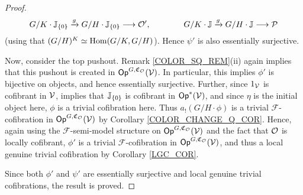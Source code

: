 \documentclass[a4paper,10pt
,draft
]{article}%
\renewcommand{\F}{\mathcal F}
\newcommand{\J}{\mathbb J}
\renewcommand{\1}{\eta}%
\begin{document}
\begin{proof}
      \begin{equation}
            G/K \cdot \J_{\set{0}} \xrightarrow{g} G/H \cdot \J_{\set{0}} \longto \O',
            \qquad \qquad
            G/K \cdot \J \xrightarrow{g} G/H \cdot \J \longto \P
      \end{equation}
      (using that $(G/H)^K \simeq \operatorname{Hom}(G/K, G/H)$).
      Hence $\psi'$ is also essentially surjective.

      Now, consider the top pushout. Remark \ref{COLOR_SQ_REM}(ii) again implies that this pushout is created in $\mathsf{Op}^{G, \mathfrak C_{\mathcal{O}}}(\mathcal V)$.
      In particular, this implies $\phi'$ is bijective on objects, and hence essentially surjective.
      Further, since $1_{\mathcal V}$ is cofibrant in $\mathcal V$, \cite[Thm. 1.15]{BM13} implies that $\J_{\set 0}$ is cofibrant in $\Op^{\**}(\V)$,
      and since $\1$ is the initial object here, $\phi$ is a trivial cofibration here.
      Thus $a_! (G/H \cdot \phi)$ is a trivial $\F$-cofibration in $\mathsf{Op}^{G, \mathfrak C_{\mathcal{O}}}(\mathcal V)$ by Corollary \ref{COLOR_CHANGE_Q_COR}.
      Hence, again using the $\F$-semi-model structure on $\mathsf{Op}^{G, \mathfrak C_{\mathcal{O}}}(\mathcal V)$ and the fact that $\mathcal{O}$ is locally cofibrant,
      $\phi'$ is a trivial $\F$-cofibration in $\mathsf{Op}^{G,\mathfrak C_{\mathcal{O}}}(\mathcal V)$,
      and thus a local genuine trivial cofibration by Corollary \ref{LGC_COR}.
      
      Since both $\phi'$ and $\psi'$ are essentially surjective and local genuine trivial cofibrations,
      the result is proved.
\end{proof}
\end{document}

